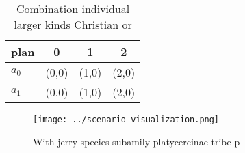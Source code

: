 \documentclass[a4paper]{article}
\begin{document}
\begin{table}
\begin{adjustbox}{width=0.5\columnwidth}
\begin{tabular}{|l|l|l|l|}
\hline
\textbf{plan} & \multicolumn{1}{c|}{\textbf{0}} & \multicolumn{1}{c|}{\textbf{1}} & \multicolumn{1}{c|}{\textbf{2}} \\ \hline
\textbf{$a_0$}  & (0,0) & (1,0) & (2,0) \\ \hline
\textbf{$a_1$}  & (0,0) & (1,0) & (2,0) \\ \hline
\end{tabular}
\end{adjustbox}
\caption{Combination individual larger kinds Christian or 
}
\end{table}

\begin{figure}
\centering
\texttt{[image: ../scenario\_visualization.png]}
\caption{With jerry species subamily platycercinae tribe p
}
\end{figure}
 
\end{document}
